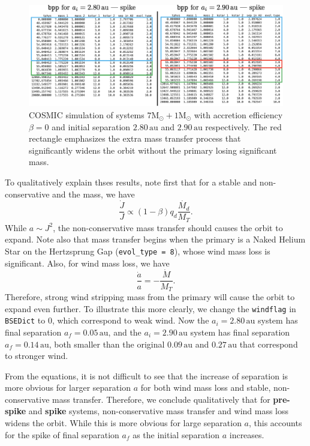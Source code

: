 \documentclass[12pt]{article}
\newcommand{\Msun}{\mathrm{M_{\odot}}}
\newcommand{\au}{\, \mathrm{au}}
\begin{document}
\begin{figure}
    \centering
    \includegraphics[width=\linewidth]{fig/sharp-inc-bpp.png}
    \caption{COSMIC simulation of systems $7 \Msun + 1 \Msun$ with accretion efficiency $\beta = 0$ and initial separation $2.80 \au$ and $2.90 \au$ respectively. The red rectangle emphasizes the extra mass transfer process that significantly widens the orbit without the primary losing significant mass.}
    \label{spike}
\end{figure}

To qualitatively explain thses results, note first that for a stable and non-conservative and the mass, we have
\[
\frac{\dot J}{J} \propto (1-\beta) q_d \frac{\dot{M_d}}{M_T}.
\]
While $a \sim J^2$, the non-conservative mass transfer should causes the orbit to expand. Note also that mass transfer begins when the primary is a Naked Helium Star on the Hertzsprung Gap (\verb|evol_type = 8|), whose wind mass loss is significant. Also, for wind mass loss, we have
\[
\frac{\dot a}{a} = - \frac{\dot M}{M_T}.
\] 
Therefore, strong wind stripping mass from the primary will cause the orbit to expand even further. To illustrate this more clearly, we change the \verb|windflag| in \verb|BSEDict| to 0, which correspond to weak wind. Now the $a_i = 2.80 \au$ system has final separation $a_f = 0.05 \au$, and the $a_i = 2.90 \au$ system has final separation $a_f = 0.14 \au$, both smaller than the original $0.09 \au$ and $0.27\au$ that correspond to stronger wind.

From the equations, it is not difficult to see that the increase of separation is more obvious for larger separation $a$ for both wind mass loss and stable, non-conservative mass transfer. Therefore, we conclude qualitatively that for \textbf{pre-spike} and \textbf{spike} systems, non-conservative mass transfer and wind mass loss widens the orbit. While this is more obvious for large separation $a$, this accounts for the spike of final separation $a_f$ as the initial separation $a$ increases.
\end{document}
